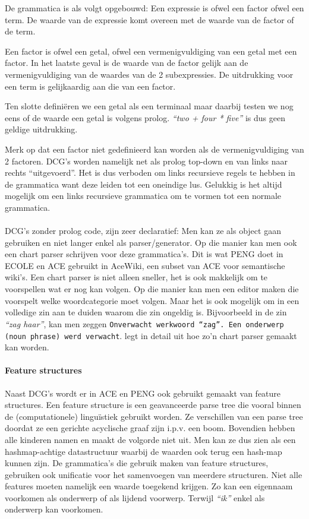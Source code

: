 \documentclass[]{article}
\theoremstyle{definition}
\newcommand{\example}[1]{\textit{``#1''}}
\begin{document}
De grammatica is als volgt opgebouwd: Een expressie is ofwel een factor ofwel een term. De waarde van de expressie komt overeen met de waarde van de factor of de term.

Een factor is ofwel een getal, ofwel een vermenigvuldiging van een getal met een factor. In het laatste geval is de waarde van de factor gelijk aan de vermenigvuldiging van de waardes van de 2 subexpressies.
De uitdrukking voor een term is gelijkaardig aan die van een factor.

Ten slotte definiëren we een getal als een terminaal maar daarbij testen we nog eens of de waarde een getal is volgens prolog. \example{two + four * five} is dus geen geldige uitdrukking.

Merk op dat een factor niet gedefinieerd kan worden als de vermenigvuldiging van 2 factoren. DCG's worden namelijk net als prolog top-down en van links naar rechts ``uitgevoerd''. Het is dus verboden om links recursieve regels te hebben in de grammatica want deze leiden tot een oneindige lus. Gelukkig is het altijd mogelijk om een links recursieve grammatica om te vormen tot een normale grammatica.

\paragraph{} DCG's zonder prolog code, zijn zeer declaratief: Men kan ze als object gaan gebruiken en niet langer enkel als parser/generator. Op die manier kan men ook een chart parser schrijven voor deze grammatica's. Dit is wat PENG doet in ECOLE\cite{Schwitter2003} en ACE gebruikt in AceWiki\cite{Kuhn2008}, een subset van ACE voor semantische wiki's. Een chart parser is niet alleen sneller, het is ook makkelijk om te voorspellen wat er nog kan volgen. Op die manier kan men een editor maken die voorspelt welke woordcategorie moet volgen. Maar het is ook mogelijk om in een volledige zin aan te duiden waarom die zin ongeldig is. Bijvoorbeeld in de zin \example{zag haar}, kan men zeggen \texttt{Onverwacht werkwoord ``zag''. Een onderwerp (noun phrase) werd verwacht}. \cite{Kuhn2008} legt in detail uit hoe zo'n chart parser gemaakt kan worden.

\paragraph{Feature structures} Naast DCG's wordt er in ACE en PENG ook gebruikt gemaakt van feature structures\cite{Shieber2003}. Een feature structure is een geavanceerde parse tree die vooral binnen de (computationele) linguïstiek gebruikt worden. Ze verschillen van een parse tree doordat ze een gerichte acyclische graaf zijn i.p.v. een boom. Bovendien hebben alle kinderen namen en maakt de volgorde niet uit. Men kan ze dus zien als een hashmap-achtige datastructuur waarbij de waarden ook terug een hash-map kunnen zijn. De grammatica's die gebruik maken van feature structures, gebruiken ook unificatie voor het samenvoegen van meerdere structuren. Niet alle features moeten namelijk een waarde toegekend krijgen. Zo kan een eigennaam voorkomen als onderwerp of als lijdend voorwerp. Terwijl \example{ik} enkel als onderwerp kan voorkomen.
\end{document}

